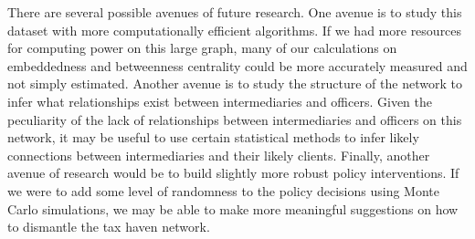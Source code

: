 \documentclass[11pt]{article}
\begin{document}
There are several possible avenues of future research. One avenue is to study
this dataset with more computationally efficient algorithms. If we had more
resources for computing power on this large graph, many of our calculations on
embeddedness and betweenness centrality could be more accurately measured and
not simply estimated. Another avenue is to study the structure of the network
to infer what relationships exist between intermediaries and officers. Given
the peculiarity of the lack of relationships between intermediaries and officers
on this network, it may be useful to use certain statistical methods to infer
likely connections between intermediaries and their likely clients. Finally,
another avenue of research would be to build slightly more robust policy
interventions. If we were to add some level of randomness to the policy
decisions using Monte Carlo simulations, we may be able to make more meaningful
suggestions on how to dismantle the tax haven network.
\end{document}
